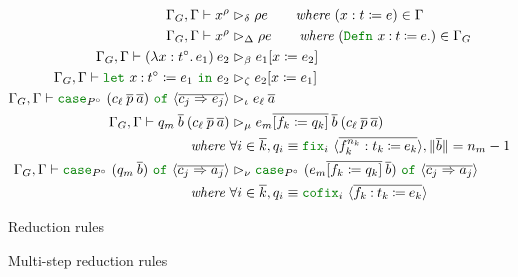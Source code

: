 \begin{figure}
 \hfill
\begin{align*}
\gg \vdash x^\rho & \reduce_\delta \rho e \qquad \textit{where} ~ (x : t \coloneqq e) \in \Gamma \\
\gg \vdash x^\rho & \reduce_\Delta \rho e \qquad \textit{where} ~ (\Defn{x}{t}{e}) \in \Gamma_G \\
\gg \vdash \app{(\abs{x}{t^\circ}{e_1})}{e_2} & \reduce_\beta \subst{e_1}{x}{e_2} \\
\gg \vdash \letin{x}{t^\circ}{e_1}{e_2} & \reduce_\zeta \subst{e_2}{x}{e_1} \\
\gg \vdash \caseof{P^\circ}{(\app{c_\ell}{\vec{p}}{\vec{a}})}{c_j}{e_j} & \reduce_\iota \app{e_\ell}{\vec{a}} \\
\gg \vdash \app{q_m}{\vec{b}}{(\app{c_\ell}{\vec{p}}{\vec{a}})}
  & \reduce_\mu \app{\substvec{e_m}{f_k}{q_k}}{\vec{b}}{(\app{c_\ell}{\vec{p}}{\vec{a}})} \\
  \textit{where} ~ & \forall i \in \vec{k}, q_i \equiv \fix{i}{f_k^{n_k}}{t_k}{e_k}, \norm{\vec{b}} = n_m - 1 \\
\gg \vdash \caseof{P^\circ}{(\app{q_m}{\vec{b}})}{c_j}{a_j}
  & \reduce_\nu \caseof{P^\circ}{(\app{\substvec{e_m}{f_k}{q_k}}{\vec{b}})}{c_j}{a_j} \\
  \textit{where} ~ & \forall i \in \vec{k}, q_i \equiv \cofix{i}{f_k}{t_k}{e_k}
\end{align*}
\caption{Reduction rules}
\label{fig:reduction}
\end{figure}

\begin{figure}
 \hfill
\vspace{-2ex}

\caption{Multi-step reduction rules}
\label{fig:reductions}
\end{figure}

